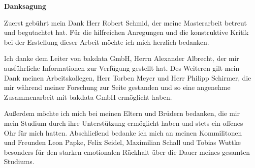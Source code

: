 \vspace*{\fill}
\begin{center}\textsf{\textbf{Danksagung}}\end{center}

\noindent Zuerst gebührt mein Dank Herr Robert Schmid, der meine Masterarbeit betreut und begutachtet hat. Für die hilfreichen Anregungen und die konstruktive Kritik bei der Erstellung dieser Arbeit möchte ich mich herzlich bedanken.

\noindent Ich danke dem Leiter von bakdata GmbH, Herrn Alexander Albrecht, der mir ausführliche Informationen zur Verfügung gestellt hat. Des Weiteren gilt mein Dank meinen Arbeitskollegen, Herr Torben Meyer und Herr Philipp Schirmer, die mir während meiner Forschung zur Seite gestanden und so eine angenehme Zusammenarbeit mit bakdata GmbH ermöglicht haben.

\noindent Außerdem möchte ich mich bei meinen Eltern und Brüdern bedanken, die mir mein Studium durch ihre Unterstützung ermöglicht haben und stets ein offenes Ohr für mich hatten. Abschließend bedanke ich mich an meinen Kommilitonen und Freunden Leon Papke, Felix Seidel, Maximilian Schall und Tobias Wuttke besonders für den starken emotionalen Rückhalt über die Dauer meines gesamten Studiums.

\vspace*{\fill}